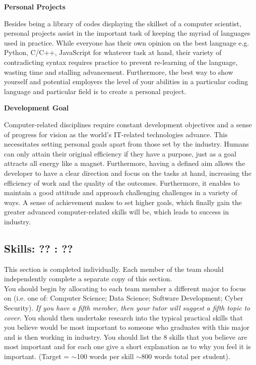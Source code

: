 \documentclass[a4paper, 11pt]{report}
\begin{document}
\textbf{Personal Projects}

Besides being a library of codes displaying the skillset of a computer scientist, personal projects assist in the important task of keeping the myriad of languages used in practice. While everyone has their own opinion on the best language e.g. Python, C/C++, JavaScript for whatever task at hand, their variety of contradicting syntax requires practice to prevent re-learning of the language, wasting time and stalling advancement. Furthermore, the best way to show yourself and potential employers the level of your abilities in a particular coding language and particular field is to create a personal project.

\textbf{Development Goal}

  Computer-related disciplines require constant development objectives and a sense of progress for vision as the world's IT-related technologies advance. This necessitates setting personal goals apart from those set by the industry. Humans can only attain their original efficiency if they have a purpose, just as a goal attracts all energy like a magnet. Furthermore, having a defined aim allows the developer to have a clear direction and focus on the tasks at hand, increasing the efficiency of work and the quality of the outcomes. Furthermore, it enables to maintain a good attitude and approach challenging challenges in a variety of ways. A sense of achievement makes to set higher goals, which finally gain the greater advanced computer-related skills will be, which leads to success in industry.



\subsection{Skills: ?? : ??}

This section is completed individually. Each member of the team should independently complete a separate copy of this section.\\
You should begin by allocating to each team member a different major to focus on (i.e. one of: Computer Science; Data Science; Software Development; Cyber Security). \textit{If you have a fifth member, then your tutor will suggest a fifth topic to cover}. You should then undertake research into the typical practical skills that you believe would be most important to someone who graduates with this major and is then working in industry. You should list the 8 skills that you believe are most important and for each one give a short explanation as to why you feel it is important. (Target = $\sim$100 words per skill $\sim$800 words total per student).
\end{document}
